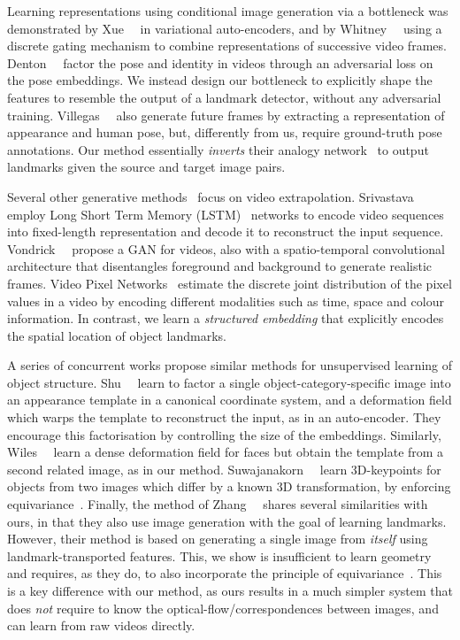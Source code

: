 \documentclass{article}
\begin{document}
Learning representations using conditional image generation via a bottleneck was demonstrated by Xue~\etal{}~\cite{xue16visual} in variational auto-encoders, and by Whitney~\etal{}~\cite{Whitney16} using a discrete gating mechanism to combine representations of successive video frames.
Denton~\etal{}~\cite{denton17} factor the pose and identity in videos through an adversarial loss on the pose embeddings. We instead design our bottleneck to explicitly shape the features to resemble the output of a landmark detector, without any adversarial training. Villegas~\etal{}~\cite{villegas2017learning} also generate future frames by extracting a representation of appearance and human pose, but, differently from us, require ground-truth pose annotations. Our method essentially \emph{inverts} their analogy network~\cite{reed2015deep} to output landmarks given the source and target image pairs.


Several other generative methods~\cite{sutskever2009recurrent,srivastava2015unsupervised,reed2016learning,vondrick2016generating,patraucean2015spatio} focus on video extrapolation. Srivastava~\etal~\cite{srivastava2015unsupervised} employ Long Short Term Memory (LSTM)~\cite{hochreiter1997long} networks to encode video sequences into fixed-length representation and decode it to reconstruct the input sequence. Vondrick~\etal~\cite{vondrick2016generating} propose a GAN for videos, also with a spatio-temporal convolutional architecture that disentangles foreground and background to generate realistic frames. Video Pixel Networks~\cite{kalchbrenner2016video} estimate the discrete joint distribution of the pixel values in a video by encoding different modalities such as time, space and colour information. In contrast, we learn a \emph{structured embedding} that explicitly encodes the spatial location of object landmarks.


A series of concurrent works propose similar methods for unsupervised learning of object structure. Shu~\etal{}~\cite{shu2018deforming} learn to factor a single object-category-specific image into an appearance template in a canonical coordinate system, and a deformation field which warps the template to reconstruct the input, as in an auto-encoder. They encourage this factorisation by controlling the size of the embeddings. Similarly, Wiles~\etal{}~\cite{Wiles18a} learn a dense deformation field for faces but obtain the template from a second related image, as in our method. Suwajanakorn~\etal{}~\cite{suwajanakorn2018discovery} learn 3D-keypoints for objects from two images which differ by a known 3D transformation, by enforcing equivariance~\cite{thewlis17unsupervised}. Finally, the method of Zhang~\etal{}~\cite{zhang2018unsupervised} shares several similarities with ours, in that they also use image generation with the goal of learning landmarks. However, their method is based on generating a single image from \emph{itself} using landmark-transported features. This, we show is insufficient to learn geometry and requires, as they do, to also incorporate the principle of equivariance~\cite{thewlis17unsupervised}. This is a key difference with our method, as ours results in a much simpler system that does \emph{not} require to know the optical-flow/correspondences between images, and can learn from raw videos directly.
\end{document}
